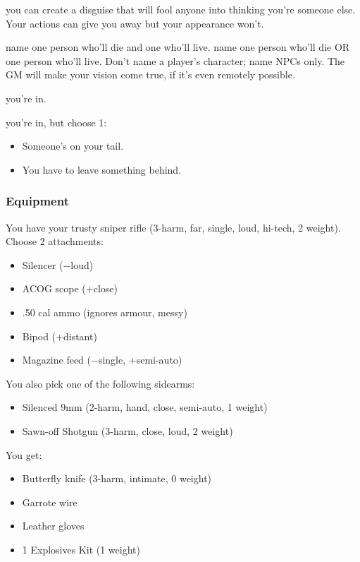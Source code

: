 
 you can create a disguise that
will fool anyone into thinking you're someone else. Your actions can give you away but your
appearance won't.

{name one person who'll die and one who'll live.}
{name one person who'll die OR one person who'll live.
Don't name a player's character; name NPCs only.
The GM will make your vision come true, if it's even remotely possible.}


{you're in.}
{you're in, but choose 1:
\begin{itemize}
\item Someone's on your tail.
\item You have to leave something behind.
\end{itemize}}

\subsubsection{Equipment}

You have your trusty sniper rifle (3-harm, far, single, loud, hi-tech, 2 weight). Choose 2 attachments:
\begin{itemize}
\item Silencer ($-$loud)
\item ACOG scope (+close)
\item .50 cal ammo (ignores armour, messy)
\item Bipod (+distant)
\item Magazine feed ($-$single, +semi-auto)
\end{itemize}

You also pick one of the following sidearms:
\begin{itemize}
\item Silenced 9mm (2-harm, hand, close, semi-auto, 1 weight)
\item Sawn-off Shotgun (3-harm, close, loud, 2 weight)
\end{itemize}

You get:
\begin{itemize}
\item Butterfly knife (3-harm, intimate, 0 weight)
\item Garrote wire
\item Leather gloves
\item 1 Explosives Kit (1 weight)
\end{itemize}

